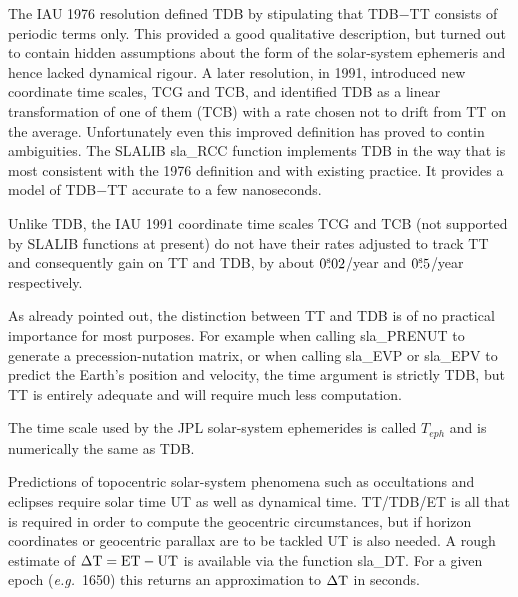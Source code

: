 \documentclass[11pt,twoside]{article}
\newcommand{\tseci}[1]   {$#1$\mbox{$^{\rm s}$}}
\newcommand{\tsec}[2]    {\tseci{#1}$\hspace{-0.3em}.#2$}
\renewcommand{\tsec}[2] {$#1^{\rm s}\hspace{-0.3em}.#2$}
\begin{document}
The IAU 1976 resolution defined TDB by
stipulating that TDB$-$TT consists of periodic terms only.
This provided
a good qualitative description, but turned out to
contain hidden assumptions about the form of the
solar-system ephemeris and hence lacked dynamical
rigour.  A later resolution, in 1991, introduced new
coordinate time scales, TCG and TCB, and identified TDB as a
linear transformation of one of them (TCB) with a rate
chosen not to drift from TT on the average.  Unfortunately
even this improved definition has proved to
contin ambiguities.  The SLALIB
sla\_RCC function implements TDB in the way that is
most consistent with the 1976 definition and
with existing practice.  It provides a model of
TDB$-$TT accurate to a few nanoseconds.

Unlike TDB, the IAU 1991 coordinate time scales TCG and TCB
(not supported by SLALIB functions at present)
do not have their rates adjusted to track TT and consequently
gain on TT and TDB, by about
\tsec{0}{02}/year and \tsec{0}{5}/year respectively.

As already pointed out, the distinction between TT and TDB is
of no practical importance for most purposes.  For
example when calling
sla\_PRENUT
to generate a precession-nutation matrix, or when calling
sla\_EVP or
sla\_EPV
to predict the
Earth's position and velocity, the time argument is strictly
TDB, but TT is entirely adequate and will require much
less computation.

The time scale used by the JPL solar-system ephemerides is called
$T_{eph}$ and is numerically the same as TDB.

Predictions of topocentric solar-system phenomena such as
occultations and eclipses require solar time UT as well as dynamical
time.  TT/TDB/ET is all that is required in order to compute the geocentric
circumstances, but if horizon coordinates or geocentric parallax
are to be tackled UT is also needed.  A rough estimate
of $\Delta {\rm T} = {\rm ET} - {\rm UT}$ is
available via the function
sla\_DT.
For a given epoch ({\it e.g.}\ 1650) this returns an approximation
to $\Delta {\rm T}$ in seconds.
\end{document}

